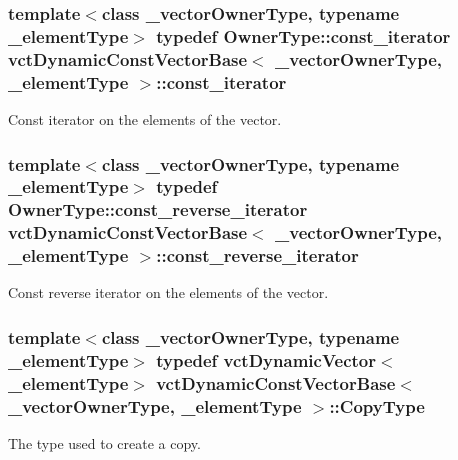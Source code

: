 \subsubsection[{const\+\_\+iterator}]{\setlength{\rightskip}{0pt plus 5cm}template$<$class \+\_\+vector\+Owner\+Type, typename \+\_\+element\+Type$>$ typedef Owner\+Type\+::const\+\_\+iterator {\bf vct\+Dynamic\+Const\+Vector\+Base}$<$ \+\_\+vector\+Owner\+Type, \+\_\+element\+Type $>$\+::{\bf const\+\_\+iterator}}\label{classvct_dynamic_const_vector_base_ad04d1e54698ac5e244d15dfacd0e603c}
Const iterator on the elements of the vector. \hypertarget{classvct_dynamic_const_vector_base_aadfcc99550b376238b6c793c17d19ca5}{}
\subsubsection[{const\+\_\+reverse\+\_\+iterator}]{\setlength{\rightskip}{0pt plus 5cm}template$<$class \+\_\+vector\+Owner\+Type, typename \+\_\+element\+Type$>$ typedef Owner\+Type\+::const\+\_\+reverse\+\_\+iterator {\bf vct\+Dynamic\+Const\+Vector\+Base}$<$ \+\_\+vector\+Owner\+Type, \+\_\+element\+Type $>$\+::{\bf const\+\_\+reverse\+\_\+iterator}}\label{classvct_dynamic_const_vector_base_aadfcc99550b376238b6c793c17d19ca5}
Const reverse iterator on the elements of the vector. \hypertarget{classvct_dynamic_const_vector_base_a010ba1a93ccebf494be5a188f923eb43}{}
\subsubsection[{Copy\+Type}]{\setlength{\rightskip}{0pt plus 5cm}template$<$class \+\_\+vector\+Owner\+Type, typename \+\_\+element\+Type$>$ typedef {\bf vct\+Dynamic\+Vector}$<$\+\_\+element\+Type$>$ {\bf vct\+Dynamic\+Const\+Vector\+Base}$<$ \+\_\+vector\+Owner\+Type, \+\_\+element\+Type $>$\+::{\bf Copy\+Type}}\label{classvct_dynamic_const_vector_base_a010ba1a93ccebf494be5a188f923eb43}
The type used to create a copy. \hypertarget{classvct_dynamic_const_vector_base_aaed13bc31a9ee4971bad765ba5c2c811}{}
